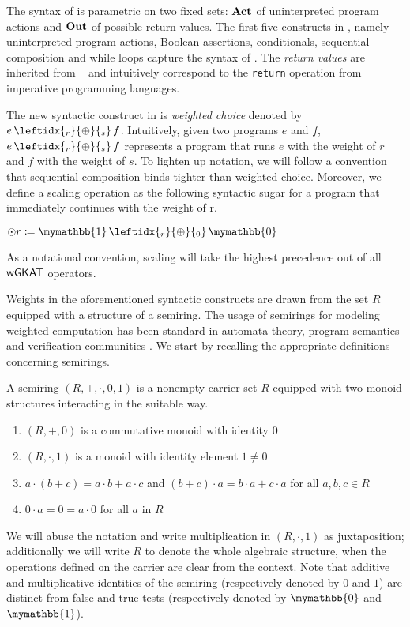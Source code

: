 \documentclass[a4paper,UKenglish,cleveref, autoref, thm-restate]{lipics-v2021}
\newcommand{\Out}{\textbf{\upshape{Out}}}
\newcommand{\Act}{\textbf{\upshape{Act}}}
\newcommand{\WC}[2]{\,\leftidx{_{#1}}{{\oplus}}{_{#2}}\,}
\newcommand{\bskip}{\mymathbb{1}}
\newcommand{\babort}{\mymathbb{0}}
\newcommand{\wgkat}{\textsf{\upshape{wGKAT}}\xspace}
\newcommand{\gkat}{\textsf{\upshape{GKAT}}\xspace}
\newcommand{\probgkat}{\textsf{\upshape{ProbGKAT}}\xspace}
\theoremstyle{plain}\newtheoremrep{thm}{Theorem}[section]
\begin{document}
	The syntax of \wgkat is parametric on two fixed sets: $\Act$ of uninterpreted program actions and $\Out$ of possible return values. The first five constructs in , namely uninterpreted program actions, Boolean assertions, conditionals, sequential composition and while loops capture the syntax of \gkat. The \emph{return values} are inherited from \probgkat~\cite{rozowski2023probabilistic} and intuitively correspond to the \texttt{return} operation from imperative programming languages. 

		The new syntactic construct in \wgkat is \emph{weighted choice} denoted by $e \WC{r}{s} f$. Intuitively, given two programs $e$ and $f$, $e \WC{r}{s} f$ represents a program that runs $e$ with the weight of $r$ and $f$ with the weight of $s$. To lighten up notation, we will follow a convention that sequential composition binds tighter than weighted choice. Moreover, we define a scaling operation as the following syntactic sugar for a program that immediately continues with the weight of r.
		\begin{defn}[Scaling] \label{scalingdef}
			$\odot r \coloneq \bskip \WC{r}{0} \babort$
		\end{defn} 
		As a notational convention, scaling will take the highest precedence out of all $\wgkat$ operators.
		
		 Weights in the aforementioned syntactic constructs are drawn from the set $R$ equipped with a structure of a semiring. The usage of semirings for modeling weighted computation has been standard in automata theory, program semantics and verification communities \cite{weightedhandbook}. We start by recalling the appropriate definitions concerning semirings.

		\begin{defn}
			A semiring $(R, +, \cdot, 0, 1)$ is a nonempty carrier set $R$ equipped with two monoid structures interacting in the suitable way.
			\begin{enumerate}
				\item $(R,+, 0)$ is a commutative monoid with identity $0$
				\item $(R, \cdot, 1)$ is a monoid with identity element $1\neq 0$
				\item $a\cdot (b+c) = a\cdot b+a \cdot c$ and $(b+c)\cdot a = b\cdot a+c \cdot a$ for all $a,b,c \in R$
				\item $0\cdot a=0=a \cdot 0$ for all $a$ in $R$
			\end{enumerate}\label{semiringDef}
		\end{defn}
		We will abuse the notation and write multiplication in $(R,\cdot,1)$ as juxtaposition; additionally we will write $R$ to denote the whole algebraic structure, when the operations defined on the carrier are clear from the context. Note that additive and multiplicative identities of the semiring (respectively denoted by $0$ and $1$) are distinct from false and true tests (respectively denoted by $\babort$ and $\bskip$). 
		
\end{document}
